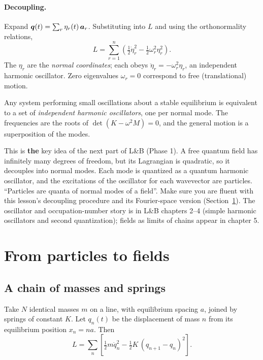 \documentclass[11pt]{article}
\begin{document}
\paragraph{Decoupling.} Expand $\bm{q}(t)=\sum_r\eta_r(t)\,\bm{a}_r$. Substituting into $L$ and using the orthonormality relations,
\begin{equation}
  L=\sum_{r=1}^n\left(\tfrac12\dot\eta_r^2-\tfrac12\omega_r^2\eta_r^2\right).
\end{equation}
The $\eta_r$ are the \emph{normal coordinates}; each obeys $\ddot\eta_r=-\omega_r^2\eta_r$, an independent harmonic oscillator. Zero eigenvalues $\omega_r=0$ correspond to free (translational) motion.

\begin{keyresult}
Any system performing small oscillations about a stable equilibrium is equivalent to a set of \emph{independent harmonic oscillators}, one per normal mode. The frequencies are the roots of $\det(K-\omega^2M)=0$, and the general motion is a superposition of the modes.
\end{keyresult}

\begin{qftbridge}
This is \textbf{the} key idea of the next part of L\&B (Phase 1). A free quantum field has infinitely many degrees of freedom, but its Lagrangian is quadratic, so it decouples into normal modes. Each mode is quantized as a quantum harmonic oscillator, and the excitations of the oscillator for each wavevector are particles. ``Particles are quanta of normal modes of a field''. Make sure you are fluent with this lesson's decoupling procedure and its Fourier-space version (Section~\ref{sec:fields}). The oscillator and occupation-number story is in L\&B chapters 2--4 (simple harmonic oscillators and second quantization); fields as limits of chains appear in chapter 5.
\end{qftbridge}

\section{From particles to fields}\label{sec:fields}

\subsection{A chain of masses and springs}

Take $N$ identical masses $m$ on a line, with equilibrium spacing $a$, joined by springs of constant $K$. Let $q_n(t)$ be the displacement of mass $n$ from its equilibrium position $x_n=na$. Then
\begin{equation}
  L=\sum_n\left[\tfrac12m\dot q_n^2-\tfrac12K\,(q_{n+1}-q_n)^2\right].
\end{equation}
\end{document}

